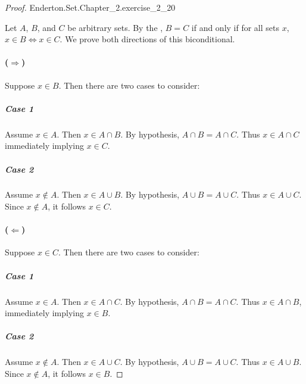 \documentclass{report}
\begin{document}
\begin{proof}

    {Enderton.Set.Chapter\_2.exercise\_2\_20}

  Let $A$, $B$, and $C$ be arbitrary sets.
  By the , $B = C$ if and only if for all sets
    $x$, $x \in B \iff x \in C$.
  We prove both directions of this biconditional.

  \paragraph{($\Rightarrow$)}%

    Suppose $x \in B$.
    Then there are two cases to consider:

    \subparagraph{Case 1}%

      Assume $x \in A$.
      Then $x \in A \cap B$.
      By hypothesis, $A \cap B = A \cap C$.
      Thus $x \in A \cap C$ immediately implying $x \in C$.

    \subparagraph{Case 2}%

      Assume $x \not\in A$.
      Then $x \in A \cup B$.
      By hypothesis, $A \cup B = A \cup C$.
      Thus $x \in A \cup C$.
      Since $x \not\in A$, it follows $x \in C$.

  \paragraph{($\Leftarrow$)}%

    Suppose $x \in C$.
    Then there are two cases to consider:

    \subparagraph{Case 1}%

      Assume $x \in A$.
      Then $x \in A \cap C$.
      By hypothesis, $A \cap B = A \cap C$.
      Thus $x \in A \cap B$, immediately implying $x \in B$.

    \subparagraph{Case 2}%

      Assume $x \not\in A$.
      Then $x \in A \cup C$.
      By hypothesis, $A \cup B = A \cup C$.
      Thus $x \in A \cup B$.
      Since $x \not\in A$, it follows $x \in B$.

\end{proof}

\subsection{}%
\label{sub:exercise-2.21}
\end{document}
